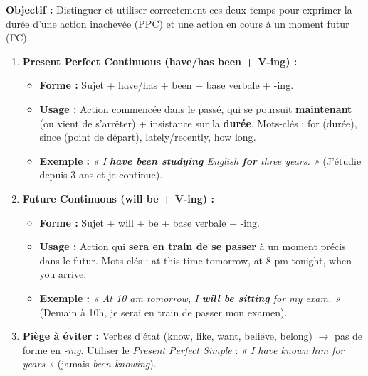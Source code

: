 \documentclass[11pt]{article}
\newcommand{\cle}[1]{{\popxbold\color{popdark}#1}}
\begin{document}
\begin{methode}
\textbf{Objectif :} Distinguer et utiliser correctement ces deux temps pour exprimer la durée d'une action inachevée (PPC) et une action en cours à un moment futur (FC).
\begin{enumerate}
    \item \textbf{Present Perfect Continuous (\cle{have/has been + V-ing}) :}
    \begin{itemize}
        \item \textbf{Forme :} Sujet + have/has + been + base verbale + -ing.
        \item \textbf{Usage :} Action commencée dans le passé, qui se poursuit \textbf{maintenant} (ou vient de s'arrêter) + insistance sur la \textbf{durée}. Mots-clés : \cle{for} (durée), \cle{since} (point de départ), \cle{lately/recently}, \cle{how long}.
        \item \textbf{Exemple :} \emph{« I \textbf{have been studying} English \textbf{for} three years. »} (J'étudie depuis 3 ans et je continue).
    \end{itemize}
    \item \textbf{Future Continuous (\cle{will be + V-ing}) :}
    \begin{itemize}
        \item \textbf{Forme :} Sujet + will + be + base verbale + -ing.
        \item \textbf{Usage :} Action qui \textbf{sera en train de se passer} à un moment précis dans le futur. Mots-clés : \cle{at this time tomorrow}, \cle{at 8 pm tonight}, \cle{when you arrive}.
        \item \textbf{Exemple :} \emph{« At 10 am tomorrow, I \textbf{will be sitting} for my exam. »} (Demain à 10h, je serai en train de passer mon examen).
    \end{itemize}
    \item \textbf{Piège à éviter :} Verbes d'état (\cle{know, like, want, believe, belong}) $\rightarrow$ pas de forme en \emph{-ing}. Utiliser le \emph{Present Perfect Simple} : \emph{« I have known him for years »} (jamais \emph{been knowing}).
\end{enumerate}
\end{methode}
\end{document}
